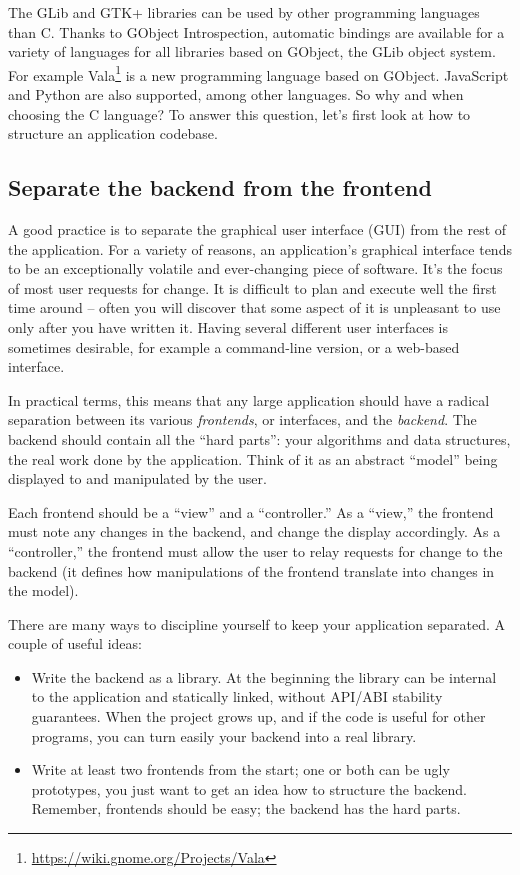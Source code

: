 The GLib and GTK+ libraries can be used by other programming languages than C. Thanks to GObject Introspection, automatic bindings are available for a variety of languages for all libraries based on GObject, the GLib object system. For example Vala\footnote{\url{https://wiki.gnome.org/Projects/Vala}} is a new programming language based on GObject. JavaScript and Python are also supported, among other languages. So why and when choosing the C language? To answer this question, let's first look at how to structure an application codebase.

\subsection{Separate the backend from the frontend}
A good practice is to separate the graphical user interface (GUI) from the rest of the application. For a variety of reasons, an application's graphical interface tends to be an exceptionally volatile and ever-changing piece of software. It's the focus of most user requests for change. It is difficult to plan and execute well the first time around -- often you will discover that some aspect of it is unpleasant to use only after you have written it. Having several different user interfaces is sometimes desirable, for example a command-line version, or a web-based interface.

In practical terms, this means that any large application should have a radical separation between its various \emph{frontends}, or interfaces, and the \emph{backend}. The backend should contain all the ``hard parts'': your algorithms and data structures, the real work done by the application. Think of it as an abstract ``model'' being displayed to and manipulated by the user.

Each frontend should be a ``view'' and a ``controller.'' As a ``view,'' the frontend must note any changes in the backend, and change the display accordingly. As a ``controller,'' the frontend must allow the user to relay requests for change to the backend (it defines how manipulations of the frontend translate into changes in the model).

There are many ways to discipline yourself to keep your application separated. A couple of useful ideas:
\begin{itemize}
  \item Write the backend as a library. At the beginning the library can be internal to the application and statically linked, without API/ABI stability guarantees. When the project grows up, and if the code is useful for other programs, you can turn easily your backend into a real library.
  \item Write at least two frontends from the start; one or both can be ugly prototypes, you just want to get an idea how to structure the backend. Remember, frontends should be easy; the backend has the hard parts.
\end{itemize}

